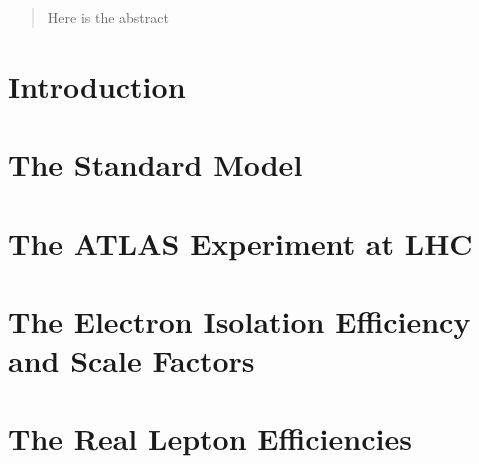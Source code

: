 \documentclass[hyperlinks]{outhesis}
\begin{document}
\begin{abstract}
Here is the abstract
\end{abstract}

\frontmatter

\maketitle

\mainmatter


\chapter{Introduction}
\label{chapter:introduction}
\graphicspath{{figures/introduction/}}



\chapter{The Standard Model}
\label{chapter:the_standard_model}
\graphicspath{{figures/the_standard_model/}}



%


\chapter{The ATLAS Experiment at LHC}
\label{chapter:altas_experiment}
\graphicspath{{figures/atlas_experiment/}}



\chapter{The Electron Isolation Efficiency and Scale Factors}
\label{chapter:electron_isolation}
\graphicspath{{figures/electron_isolation}}



\chapter{The Real Lepton Efficiencies}
\label{chapter:real_lepton_efficiencies}
\graphicspath{{figures/real_lepton_efficiencies}}

\end{document}
